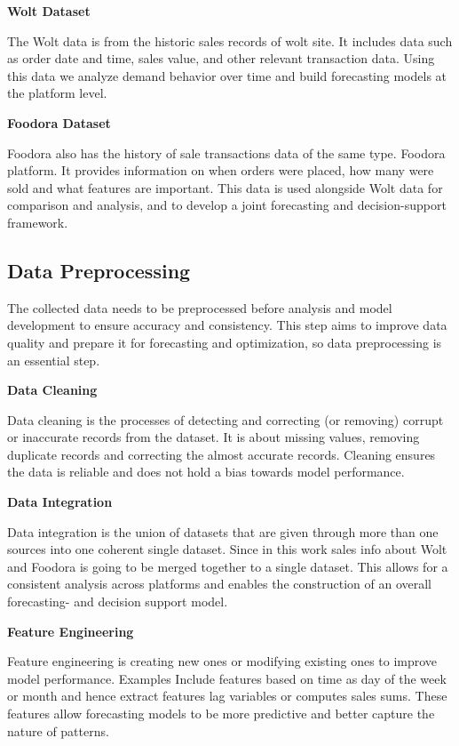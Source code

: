 \textbf{Wolt Dataset}

The Wolt data is from the historic sales records of wolt site. It includes data such as order date and time, sales value, and other relevant transaction data. Using this data we analyze demand behavior over time and build forecasting models at the platform level.

\textbf{Foodora Dataset}

Foodora also has the history of sale transactions data of the same type. Foodora platform. It provides information on when orders were placed, how many were sold and what features are important. This data is used alongside Wolt data for comparison and analysis, and to develop a joint forecasting and decision-support framework.


\subsection{Data Preprocessing}

The collected data needs to be preprocessed before analysis and model development to ensure accuracy and consistency. This step aims to improve data quality and prepare it for forecasting and optimization, so data preprocessing is an essential step.

\textbf{Data Cleaning}

Data cleaning is the processes of detecting and correcting (or removing) corrupt or inaccurate records from the dataset. It is about missing values, removing duplicate records and correcting the almost accurate records. Cleaning ensures the data is reliable and does not hold a bias towards model performance.

\textbf{Data Integration}

Data integration is the union of datasets that are given through more than one sources into one coherent single dataset. Since in this work sales info about Wolt and Foodora is going to be merged together to a single dataset. This allows for a consistent analysis across platforms and enables the construction of an overall forecasting- and decision support model.

\textbf{Feature Engineering}

Feature engineering is creating new ones or modifying existing ones to improve model performance. Examples Include features based on time as day of the week or month and hence extract features lag variables or computes sales sums. These features allow forecasting models to be more predictive and better capture the nature of patterns.

